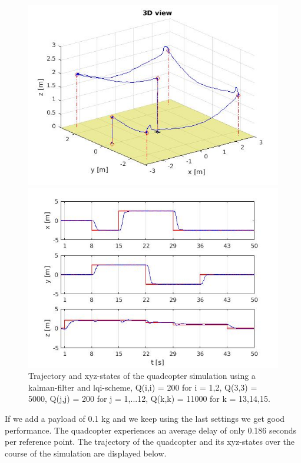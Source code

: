 \documentclass[]{article}
\begin{document}
\begin{figure}[H]
\begin{minipage}{.5\textwidth}
\includegraphics[width=\textwidth]{kaltraj2.jpg}
\end{minipage}%
\begin{minipage}{.5\textwidth}
\includegraphics[width=\textwidth]{kalstate2.jpg}
\end{minipage}
\caption{Trajectory and xyz-states of the quadcopter simulation using a kalman-filter and lqi-scheme, Q(i,i)  = 200 for i = 1,2, Q(3,3) = 5000, Q(j,j) = 200 for j = 1,...12, Q(k,k) = 11000 for k = 13,14,15. }
\end{figure}

If we add a payload of 0.1 kg and we keep using the last settings we get good performance. The quadcopter experiences an average delay of only 0.186 seconds per reference point. The trajectory of the quadcopter and its xyz-states over the course of the simulation are displayed below. 
\end{document}
